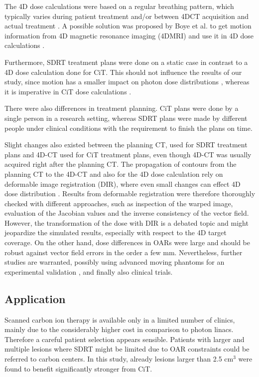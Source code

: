 \documentclass[type=dr, dr=rernat, acm$^3$entcolor=tud7b,colorbacktitle, bigchapter, openright, twoside, 12pt ]{tudthesis}
\begin{document}
The 4D dose calculations were based on a regular breathing pattern, which typically varies during patient treatment and/or between 4DCT acquisition 
and actual treatment \cite{Verma2010, Malinowski2011}. A possible solution was proposed by Boye et al. to get motion information from 4D magnetic resonance imaging (4DMRI)
and use it in 4D dose calculations \cite{Boye2013}.

Furthermore, SDRT treatment plans were done on a static case in contrast to a 4D dose calculation done for CiT. This should not influence the 
results of our study, since motion has a smaller impact on photon dose distributions \cite{Zou2014}, whereas it is imperative in CiT dose calculations \cite{Bert2011}. 

There were also differences in treatment planning. CiT plans were done by a single person in a research setting, whereas SDRT plans were made by
different people under clinical conditions with the requirement to finish the plans on time. 

Slight changes also existed between the planning CT, used for SDRT treatment plans and 4D-CT used for CiT treatment plans, even though 4D-CT was 
usually acquired right after the planning CT. The propagation of contours from the planning CT to the 4D-CT and also for the 4D dose calculation 
rely on deformable image registration (DIR), where even small changes can effect 4D dose distribution \cite{Kashani2008}. Results from deformable registration
were therefore thoroughly checked with different approaches, such as inspection of the warped image, evaluation of the Jacobian values and the 
inverse consistency of the vector field. However, the transformation of the dose with DIR is a debated topic and might jeopardize the simulated 
results, especially with respect to the 4D target coverage. On the other hand, dose differences in OARs were large and should be robust against 
vector field errors in the order a few mm. Nevertheless, further studies are warranted, possibly using advanced moving phantoms for an experimental 
validation \cite{Perrin2014}, and finally also clinical trials.

\subsection{Application}
Scanned carbon ion therapy is available only in a limited number of clinics, mainly due to the considerably higher cost in comparison to photon linacs.
Therefore a careful patient selection appears sensible. Patients with larger and multiple lesions where SDRT might be limited due to OAR constraints 
could be referred to carbon centers. In this study, already lesions larger than 2.5 cm$^3$ were found to benefit significantly stronger from CiT.



{}
\end{document}
